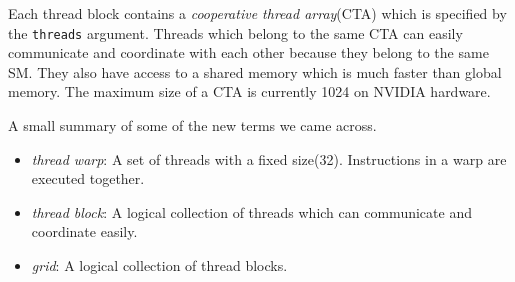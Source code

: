 \documentclass[12pt,a4paper]{article}
\begin{document}
Each thread block contains a \emph{cooperative thread array}(CTA) which is specified by the \texttt{threads} argument. Threads which belong to the same CTA can easily communicate and coordinate with each other because they belong to the same SM. They also have access to a shared memory which is much faster than global memory. The maximum size of a CTA is currently 1024 on NVIDIA hardware.

A small summary of some of the new terms we came across.

\begin{itemize}
\item \emph{thread warp}: A set of threads with a fixed size(32). Instructions in a warp are executed together.


\item \emph{thread block}: A logical collection of threads which can communicate and coordinate easily.


\item \emph{grid}: A logical collection of thread blocks.

\end{itemize}
\end{document}
